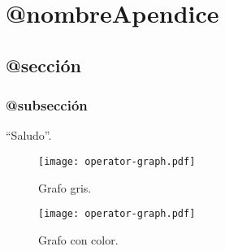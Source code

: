 \chapter{@nombreApendice}
\label{apendiceA}


\section{@sección}
\blindtext

\subsection{@subsección}
\Blindtext

``Saludo''.

\begin{figure}[h!]
\centering
\texttt{[image: operator-graph.pdf]}
\caption[Grafo]{Grafo gris.}
\label{imagen:grafo}
\end{figure}

\begin{figure}[h!]
\centering
\texttt{[image: operator-graph.pdf]}
\caption[Grafo coloreado (esto sale en la tabla de contenidos)]{Grafo con color.}
\label{imagen:grafodecolores}
\end{figure}
